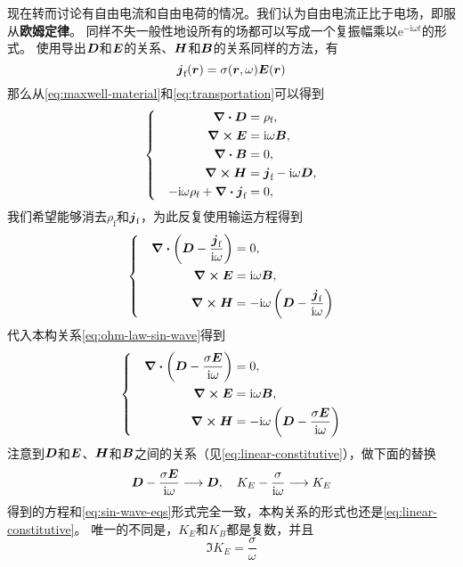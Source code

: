 \documentclass[UTF8, a4paper]{ctexart}
\newcommand*{\ii}{\mathrm{i}}
\newcommand*{\ee}{\mathrm{e}}
\newenvironment{bigcase}{\left\{\quad\begin{aligned}}{\end{aligned}\right.}
\begin{document}
现在转而讨论有自由电流和自由电荷的情况。我们认为自由电流正比于电场，即服从\textbf{欧姆定律}。
同样不失一般性地设所有的场都可以写成一个复振幅乘以$\ee^{- \ii \omega t}$的形式。
使用导出$\vb*{D}$和$\vb*{E}$的关系、$\vb*{H}$和$\vb*{B}$的关系同样的方法，有
\begin{equation}
    \vb*{j}_\text{f}(\vb*{r}) = \sigma(\vb*{r}, \omega) \vb*{E}(\vb*{r})
    \label{eq:ohm-law-sin-wave}
\end{equation}
那么从\eqref{eq:maxwell-material}和\eqref{eq:transportation}可以得到
\[
    \begin{bigcase}
        \div{\vb*{D}} &= \rho_\text{f}, \\
        \curl{\vb*{E}} &= \ii \omega \vb*{B}, \\
        \div{\vb*{B}} &= 0, \\
        \curl{\vb*{H}} &= \vb*{j}_\text{f} - \ii \omega \vb*{D}, \\
        - \ii \omega \rho_\text{f} + \div{\vb*{j}_\text{f}} &= 0,
    \end{bigcase}
\]
我们希望能够消去$\rho_\text{f}$和$\vb*{j}_\text{f}$，为此反复使用输运方程得到
\[
    \begin{bigcase}
        \div{\left( \vb*{D} - \frac{\vb*{j}_\text{f}}{\ii \omega} \right)   } &= 0, \\
        \curl{\vb*{E}} &= \ii \omega \vb*{B}, \\
        \curl{\vb*{H}} &=  - \ii \omega \left( \vb*{D} - \frac{\vb*{j}_\text{f}}{\ii \omega} \right)
    \end{bigcase}
\]
代入本构关系\eqref{eq:ohm-law-sin-wave}得到
\[
    \begin{bigcase}
        \div{\left( \vb*{D} - \frac{\sigma \vb*{E}}{\ii \omega} \right)   } &= 0, \\
        \curl{\vb*{E}} &= \ii \omega \vb*{B}, \\
        \curl{\vb*{H}} &=  - \ii \omega \left( \vb*{D} - \frac{\sigma \vb*{E}}{\ii \omega} \right)
    \end{bigcase}
\]
注意到$\vb*{D}$和$\vb*{E}$、$\vb*{H}$和$\vb*{B}$之间的关系（见\eqref{eq:linear-constitutive}），做下面的替换
\[
    \vb*{D} - \frac{\sigma \vb*{E}}{\ii \omega} \longrightarrow \vb*{D}, \quad K_E - \frac{\sigma}{\ii \omega} \longrightarrow K_E
\]
得到的方程和\eqref{eq:sin-wave-eqs}形式完全一致，本构关系的形式也还是\eqref{eq:linear-constitutive}。
唯一的不同是，$K_E$和$K_B$都是复数，并且
\begin{equation}
    \Im K_E = \frac{\sigma}{\omega}
\end{equation}
\end{document}
